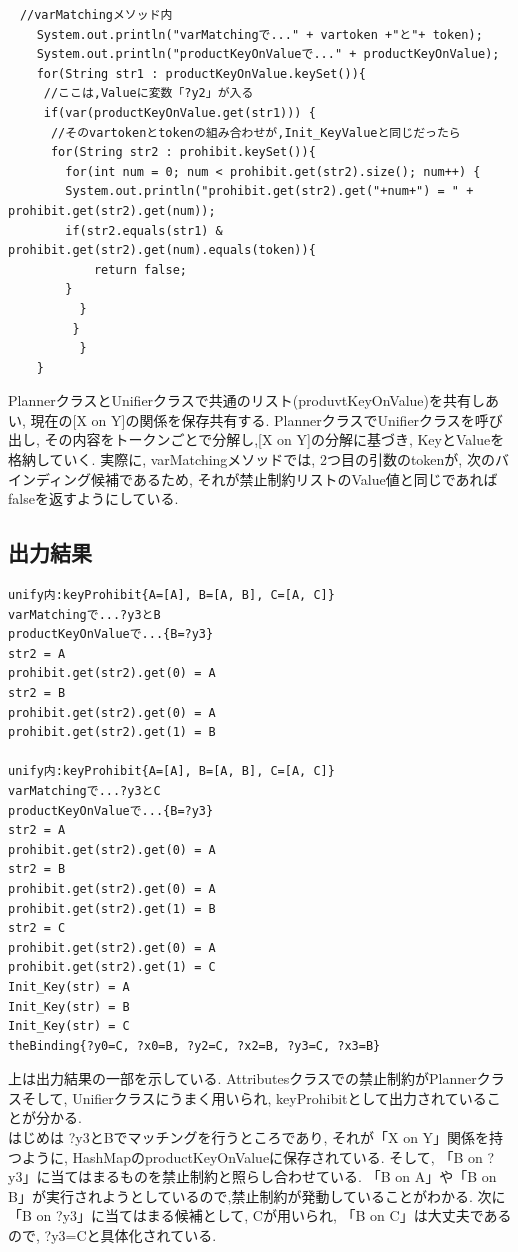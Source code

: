 \documentclass[uplatex,12pt]{jsarticle}
\begin{document}
\begin{lstlisting}[caption=禁止制約をHashMapに管理, label=src:No1]
　//varMatchingメソッド内
	System.out.println("varMatchingで..." + vartoken +"と"+ token);
	System.out.println("productKeyOnValueで..." + productKeyOnValue);
	for(String str1 : productKeyOnValue.keySet()){
	 //ここは,Valueに変数「?y2」が入る
	 if(var(productKeyOnValue.get(str1))) {
	  //そのvartokenとtokenの組み合わせが,Init_KeyValueと同じだったら
	  for(String str2 : prohibit.keySet()){
	    for(int num = 0; num < prohibit.get(str2).size(); num++) {
		System.out.println("prohibit.get(str2).get("+num+") = " + prohibit.get(str2).get(num));
		if(str2.equals(str1) & prohibit.get(str2).get(num).equals(token)){
			return false;
		}
	      }
	     }
          }
	}
\end{lstlisting}
PlannerクラスとUnifierクラスで共通のリスト(produvtKeyOnValue)を共有しあい, 現在の[X on Y]の関係を保存共有する. PlannerクラスでUnifierクラスを呼び出し, その内容をトークンごとで分解し,[X on Y]の分解に基づき, KeyとValueを格納していく.
実際に, varMatchingメソッドでは, 2つ目の引数のtokenが, 次のバインディング候補であるため, それが禁止制約リストのValue値と同じであればfalseを返すようにしている.

\subsection{出力結果}
\begin{lstlisting}
unify内:keyProhibit{A=[A], B=[A, B], C=[A, C]}
varMatchingで...?y3とB
productKeyOnValueで...{B=?y3}
str2 = A
prohibit.get(str2).get(0) = A
str2 = B
prohibit.get(str2).get(0) = A
prohibit.get(str2).get(1) = B

unify内:keyProhibit{A=[A], B=[A, B], C=[A, C]}
varMatchingで...?y3とC
productKeyOnValueで...{B=?y3}
str2 = A
prohibit.get(str2).get(0) = A
str2 = B
prohibit.get(str2).get(0) = A
prohibit.get(str2).get(1) = B
str2 = C
prohibit.get(str2).get(0) = A
prohibit.get(str2).get(1) = C
Init_Key(str) = A
Init_Key(str) = B
Init_Key(str) = C
theBinding{?y0=C, ?x0=B, ?y2=C, ?x2=B, ?y3=C, ?x3=B}
\end{lstlisting}
上は出力結果の一部を示している. Attributesクラスでの禁止制約がPlannerクラスそして, Unifierクラスにうまく用いられ, keyProhibitとして出力されていることが分かる.\\
はじめは {?y3とB}でマッチングを行うところであり, それが「X on Y」関係を持つように, HashMapのproductKeyOnValueに保存されている. そして, 「B on ?y3」に当てはまるものを禁止制約と照らし合わせている. 「B on A」や「B on B」が実行されようとしているので,禁止制約が発動していることがわかる. 次に「B on ?y3」に当てはまる候補として, Cが用いられ, 「B on C」は大丈夫であるので, {?y3=C}と具体化されている.
\end{document}
